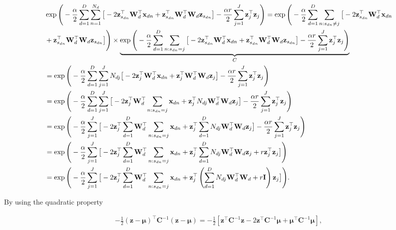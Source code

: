 	\begin{align}
	&\exp\Bigg(-\frac{\alpha}{2} \sum_{d=1}^{D}\sum_{n=1}^{N_d}\big[ -2 \mathbf{z}_{s_{dn}} ^\top \mathbf{W}_d^\top \mathbf{x}_{dn}+\mathbf{z}_{s_{dn}}^\top \mathbf{W}_d^\top \mathbf{W}_d \mathbf{z}_{s_{dn}} \big] -\frac{\alpha r}{2} \sum_{j=1}^{J}\mathbf{z}_j^\top\mathbf{z}_j \Bigg) = \exp\Bigg(-\frac{\alpha}{2} \sum_{d=1}^{D}\sum_{n:s_{dn}\ne j}\big[  -2 \mathbf{z}_{s_{dn}} ^\top \mathbf{W}_d^\top \mathbf{x}_{dn}\notag\\
	&+ \mathbf{z}_{s_{dn}}^\top \mathbf{W}_d^\top \mathbf{W}_d \mathbf{z}_{s_{dn}} \big] \Bigg)\times \underbrace{\exp\Bigg(-\frac{\alpha}{2} \sum_{d=1}^{D}\sum_{n:s_{dn}=j}\big[ -2 \mathbf{z}_{s_{dn}} ^\top \mathbf{W}_d^\top \mathbf{x}_{dn}+\mathbf{z}_{s_{dn}}^\top \mathbf{W}_d^\top \mathbf{W}_d \mathbf{z}_{s_{dn}} \big]-\frac{\alpha r}{2} \sum_{j=1}^{J}\mathbf{z}_j^\top\mathbf{z}_j\Bigg)}_{C} \notag\\
	&=\exp\Bigg(-\frac{\alpha}{2} \sum_{d=1}^{D}\sum_{j=1}^J N_{dj}\big[ -2 \mathbf{z}_j ^\top \mathbf{W}_d^\top \mathbf{x}_{dn}+\mathbf{z}_j^\top \mathbf{W}_d^\top \mathbf{W}_d \mathbf{z}_j \big]-\frac{\alpha r}{2} \sum_{j=1}^{J}\mathbf{z}_j^\top\mathbf{z}_j\Bigg) \notag\\
	&=\exp\Bigg(-\frac{\alpha}{2} \sum_{d=1}^{D}\sum_{j=1}^J \big[ -2 \mathbf{z}_j ^\top \mathbf{W}_d^\top \sum_{n:s_{dn}=j}\mathbf{x}_{dn}+\mathbf{z}_j^\top N_{dj}\mathbf{W}_d^\top \mathbf{W}_d \mathbf{z}_j \big]-\frac{\alpha r}{2} \sum_{j=1}^{J}\mathbf{z}_j^\top\mathbf{z}_j\Bigg) \notag \\
	&=\exp\Bigg(-\frac{\alpha}{2}\sum_{j=1}^J \big[ -2 \mathbf{z}_j ^\top  \sum_{d=1}^{D}\mathbf{W}_d^\top \sum_{n:s_{dn}=j}\mathbf{x}_{dn}+\mathbf{z}_j^\top  \sum_{d=1}^{D} N_{dj}\mathbf{W}_d^\top \mathbf{W}_d \mathbf{z}_j \big]-\frac{\alpha r}{2} \sum_{j=1}^{J}\mathbf{z}_j^\top\mathbf{z}_j\Bigg) \notag \\
	&= \exp\Bigg(-\frac{\alpha}{2}\sum_{j=1}^J \big[ -2 \mathbf{z}_j ^\top  \sum_{d=1}^{D}\mathbf{W}_d^\top \sum_{n:s_{dn}=j}\mathbf{x}_{dn}+\mathbf{z}_j^\top  \sum_{d=1}^{D} N_{dj}\mathbf{W}_d^\top \mathbf{W}_d \mathbf{z}_j + r\mathbf{z}_j^\top\mathbf{z}_j\big]\Bigg) \notag \\
	&= \exp\Bigg(-\frac{\alpha}{2}\sum_{j=1}^J \big[ -2 \mathbf{z}_j ^\top  \sum_{d=1}^{D}\mathbf{W}_d^\top \sum_{n:s_{dn}=j}\mathbf{x}_{dn}+\mathbf{z}_j^\top  \left(\sum_{d=1}^{D} N_{dj}\mathbf{W}_d^\top \mathbf{W}_d + r\mathbf{I}\right) \mathbf{z}_j \big]\Bigg).
	\label{eq:llExp1lin}
	\end{align}
	
	By using the quadratic property
	
	\begin{align}
	-\frac{1}{2}\left(\mathbf{z}-\boldsymbol{\mu}\right)^\top \boldsymbol{C}^{-1} \left(\mathbf{z}-\boldsymbol{\mu}\right) = -\frac{1}{2}\left[\mathbf{z}^\top \boldsymbol{C}^{-1}\mathbf{z} -2\mathbf{z}^\top \boldsymbol{C}^{-1}\boldsymbol{\mu} + \boldsymbol{\mu}^\top\boldsymbol{C}^{-1}\boldsymbol{\mu}\right] \label{eq:quadlin},
	\end{align}
	
